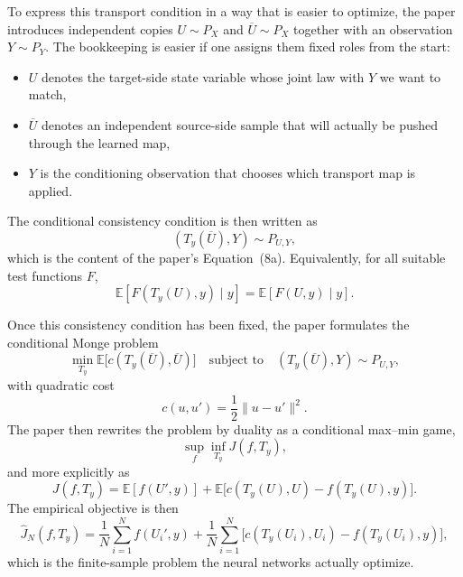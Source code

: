 \documentclass[11pt]{report}
\newcommand{\E}{\mathbb{E}}
\begin{document}
To express this transport condition in a way that is easier to optimize, the paper
introduces independent copies $U\sim P_X$ and $\overline U\sim P_X$ together with
an observation $Y\sim P_Y$.  The bookkeeping is easier if one assigns them fixed
roles from the start:
\begin{itemize}
  \item $U$ denotes the target-side state variable whose joint law with $Y$ we want to match,
  \item $\overline U$ denotes an independent source-side sample that will actually be pushed through the learned map,
  \item $Y$ is the conditioning observation that chooses which transport map is applied.
\end{itemize}
The conditional consistency condition is then written
as
\begin{equation}
(T_y(\overline U),Y) \sim P_{U,Y},
\label{eq:aljarrah-joint-law-condition}
\end{equation}
which is the content of the paper's Equation~(8a).  Equivalently, for all suitable
test functions $F$,
\begin{equation}
\E[F(T_y(U),y)\mid y] = \E[F(U,y)\mid y].
\label{eq:aljarrah-consistency}
\end{equation}

Once this consistency condition has been fixed, the paper formulates the
conditional Monge problem
\begin{equation}
\min_{T_y} \E\bigl[c(T_y(\overline U),\overline U)\bigr]
\quad\text{subject to}\quad
(T_y(\overline U),Y)\sim P_{U,Y},
\label{eq:aljarrah-conditional-monge}
\end{equation}
with quadratic cost
\begin{equation}
c(u,u')=\frac12\|u-u'\|^2.
\label{eq:aljarrah-quadratic-cost}
\end{equation}
The paper then rewrites the problem by duality as a conditional max--min game,
\begin{equation}
\sup_f\inf_{T_y} J(f,T_y),
\label{eq:aljarrah-minimax-abstract}
\end{equation}
and more explicitly as
\begin{equation}
J(f,T_y)
=
\E[f(U',y)]
+
\E\bigl[c(T_y(U),U)-f(T_y(U),y)\bigr].
\label{eq:aljarrah-max-min}
\end{equation}
The empirical objective is then
\begin{equation}
\widehat J_N(f,T_y)
=
\frac1N\sum_{i=1}^{N} f(U_i',y)
+
\frac1N\sum_{i=1}^{N}\bigl[c(T_y(U_i),U_i)-f(T_y(U_i),y)\bigr],
\label{eq:aljarrah-empirical-objective}
\end{equation}
which is the finite-sample problem the neural networks actually optimize.
\end{document}
